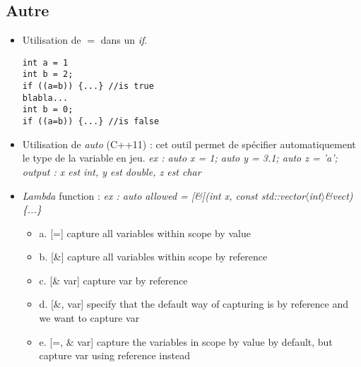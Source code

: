 \documentclass[12pt,a4paper]{article}
\begin{document}
\subsection{Autre}
\begin{itemize}
\item Utilisation de $=$ dans un \textit{if}.
\begin{lstlisting}
int a = 1
int b = 2;
if ((a=b)) {...} //is true
blabla...
int b = 0;
if ((a=b)) {...} //is false
\end{lstlisting}
\item Utilisation de \textit{auto} (C++11) : cet outil permet de spécifier automatiquement le type de la variable en jeu. 
\newline \textit{ex : auto x = 1; auto y = 3.1; auto z = 'a';}
\newline \textit{output : x est int, y est double, z est char}
\item \textit{Lambda} function : \textit{ex : auto allowed = [\&](int x, const std::vector$\langle$int$\rangle$\&vect)\{...\}}
\begin{itemize}
\item a. [=] capture all variables within scope by value
\item b. [\&] capture all variables within scope by reference
\item c. [\& var] capture var by reference
\item d. [\&, var] specify that the default way of capturing is by reference and we want to capture var
\item e. [=, \& var] capture the variables in scope by value by default, but capture var using reference instead
\end{itemize}
\end{itemize}
\end{document}
